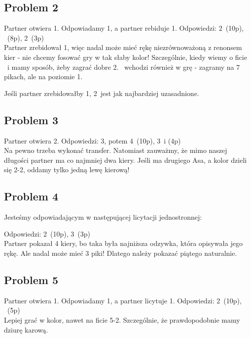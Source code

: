 \documentclass[12pt, a4paper]{article}
\begin{document}
\subsection*{Problem 2}
Partner otwiera 1\diams. Odpowiadamy 1\hearts, a partner rebiduje 1\spades.
Odpowiedzi: 2\clubs\ (10p), \pass\ (8p), 2\hearts\ (3p)\\
Partner zrebidował 1\spades, więc nadal może mieć rękę niezrównoważoną z renonsem kier - nie
chcemy fosować gry w tak słaby kolor! Szczególnie, kiedy wiemy o ficie \diams\ i mamy sposób, 
żeby zagrać dobre 2\diams. \pass\ wchodzi również w grę - zagramy na 7 pikach, ale na poziomie 1.

Jeśli partner zrebidowałby 1\nt, 2\hearts\ jest jak najbardziej uzasadnione.


\subsection*{Problem 3}
Partner otwiera 2\nt.
Odpowiedzi: 3\diams, potem 4\hearts\ (10p), 3\diams\ i \pass (4p) \\
Na pewno trzeba wykonać transfer. Natomiast zauważmy, że mimo naszej długości partner ma co najmniej dwa kiery.
Jeśli ma drugiego Asa, a kolor dzieli się 2-2, oddamy tylko jedną lewę kierową!

\pagebreak
\subsection*{Problem 4}
Jesteśmy odpowiadającym w następującej licytacji jednostronnej:
\begin{center}
\end{center}
Odpowiedzi: 2\spades\ (10p), 3\nt\ (3p) \\
Partner pokazał 4 kiery, bo taka była najniższa odzywka, która opisywała jego rękę.
Ale nadal może mieć 3 piki! Dlatego należy pokazać piątego naturalnie.


\subsection*{Problem 5}
Partner otwiera 1\hearts. Odpowiadamy 1\spades, a partner licytuje 1\nt.
Odpowiedzi: 2\hearts\ (10p), \pass\ (5p) \\
Lepiej grać w kolor, nawet na ficie 5-2. Szczególnie, że prawdopodobnie mamy dziurę karową.
\end{document}
